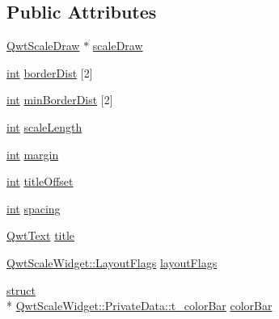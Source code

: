 \subsection*{Public Attributes}
\begin{DoxyCompactItemize}
\item 
\hyperlink{class_qwt_scale_draw}{Qwt\-Scale\-Draw} $\ast$ \hyperlink{class_qwt_scale_widget_1_1_private_data_af1987ab59f2a5dfb963573657e58a869}{scale\-Draw}
\item 
\hyperlink{ioapi_8h_a787fa3cf048117ba7123753c1e74fcd6}{int} \hyperlink{class_qwt_scale_widget_1_1_private_data_a361e6813e0f14c687bd8776e6ce47fac}{border\-Dist} \mbox{[}2\mbox{]}
\item 
\hyperlink{ioapi_8h_a787fa3cf048117ba7123753c1e74fcd6}{int} \hyperlink{class_qwt_scale_widget_1_1_private_data_aea6a4d25b175ab83c725ab68220fd9d7}{min\-Border\-Dist} \mbox{[}2\mbox{]}
\item 
\hyperlink{ioapi_8h_a787fa3cf048117ba7123753c1e74fcd6}{int} \hyperlink{class_qwt_scale_widget_1_1_private_data_a5f8f56a9ff1c06421e0cc0ed4fae8562}{scale\-Length}
\item 
\hyperlink{ioapi_8h_a787fa3cf048117ba7123753c1e74fcd6}{int} \hyperlink{class_qwt_scale_widget_1_1_private_data_a2fa5969894150a7b44ebbbcd8f8d7407}{margin}
\item 
\hyperlink{ioapi_8h_a787fa3cf048117ba7123753c1e74fcd6}{int} \hyperlink{class_qwt_scale_widget_1_1_private_data_abd5207b4a347d93e147f84296afa7108}{title\-Offset}
\item 
\hyperlink{ioapi_8h_a787fa3cf048117ba7123753c1e74fcd6}{int} \hyperlink{class_qwt_scale_widget_1_1_private_data_ae0c075685a27602994be923d3147c2fd}{spacing}
\item 
\hyperlink{class_qwt_text}{Qwt\-Text} \hyperlink{class_qwt_scale_widget_1_1_private_data_a0314a48e99532cd99984d5690c6beab3}{title}
\item 
\hyperlink{class_qwt_scale_widget_a19dcd8adcfd10fe26e021fa47e22b843}{Qwt\-Scale\-Widget\-::\-Layout\-Flags} \hyperlink{class_qwt_scale_widget_1_1_private_data_acb2232569889ad50dc3e26ed7b1d84bc}{layout\-Flags}
\item 
\hyperlink{sdlgamepad_8dox_aba655c5729da86df745f0c8e7f9ba8d2}{struct} \\*
\hyperlink{struct_qwt_scale_widget_1_1_private_data_1_1t__color_bar}{Qwt\-Scale\-Widget\-::\-Private\-Data\-::t\-\_\-color\-Bar} \hyperlink{class_qwt_scale_widget_1_1_private_data_ab230f5ffb19eb5d9177e68e6a1da6967}{color\-Bar}
\end{DoxyCompactItemize}



